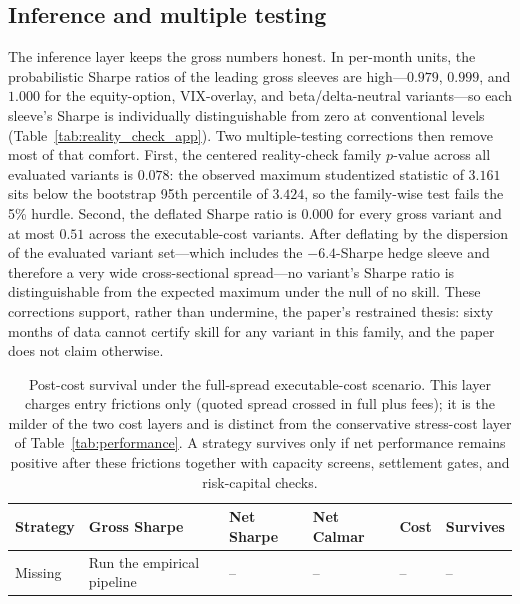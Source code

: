 \subsection{Inference and multiple testing}

The inference layer keeps the gross numbers honest. In per-month units, the probabilistic
Sharpe ratios of the leading gross sleeves are high---\(0.979\), \(0.999\), and \(1.000\)
for the equity-option, VIX-overlay, and beta/delta-neutral variants---so each sleeve's
Sharpe is individually distinguishable from zero at conventional levels
(Table~\ref{tab:reality_check_app}). Two multiple-testing corrections then remove most of
that comfort. First, the centered reality-check family \(p\)-value across all evaluated
variants is \(0.078\): the observed maximum studentized statistic of \(3.161\) sits below
the bootstrap 95th percentile of \(3.424\), so the family-wise test fails the 5\% hurdle.
Second, the deflated Sharpe ratio is \(0.000\) for every gross variant and at most
\(0.51\) across the executable-cost variants. After
deflating by the dispersion of the evaluated variant set---which includes the
\(-6.4\)-Sharpe hedge sleeve and therefore a very wide cross-sectional spread---no
variant's Sharpe ratio is distinguishable from the expected maximum under the null of no
skill. These corrections support, rather than undermine, the paper's restrained thesis:
sixty months of data cannot certify skill for any variant in this family, and the paper
does not claim otherwise.

\begin{table}[H]
\centering
\scriptsize
{}
  {\resizebox{\textwidth}{!}{}}
  {\begin{tabular}{llllll}\toprule Strategy & Gross Sharpe & Net Sharpe & Net Calmar & Cost & Survives \\\midrule
  Missing & Run the empirical pipeline & -- & -- & -- & -- \\\bottomrule\end{tabular}}
\caption{Post-cost survival under the full-spread executable-cost scenario. This layer
charges entry frictions only (quoted spread crossed in full plus fees); it is the milder
of the two cost layers and is distinct from the conservative stress-cost layer of
Table~\ref{tab:performance}. A strategy survives only if net performance remains positive
after these frictions together with capacity screens, settlement gates, and risk-capital
checks.}
\label{tab:post_cost_survival}
\end{table}

